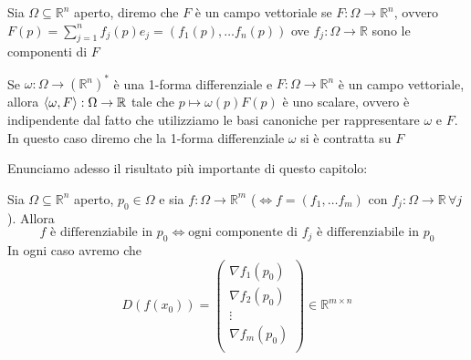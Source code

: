 \documentclass[openany, italian]{book}
\begin{document}
\begin{definition}
Sia $\Omega \subseteq \mathbb{R}^n$ aperto, diremo che $F$ è un campo vettoriale se $F: \Omega \to \mathbb{R}^n$, ovvero $F(p) = \sum\limits_{j=1}^n f_j(p)e_j = (f_1(p), \ldots f_n(p))$ ove $f_j: \Omega \to \mathbb{R}$ sono le componenti di $F$
\end{definition}
\begin{remark}
Se $\omega: \Omega \to (\mathbb{R}^n)^{*}$ è una 1-forma differenziale e $F: \Omega \to \mathbb{R}^n$ è un campo vettoriale, allora $\langle \omega, F \rangle: \Omega \to \mathbb{R}$ tale che $p \mapsto \omega(p)F(p)$ è uno scalare, ovvero è indipendente dal fatto che utilizziamo le basi canoniche per rappresentare $\omega$ e $F$. In questo caso diremo che la 1-forma differenziale $\omega$ si è contratta su $F$
\end{remark}
Enunciamo adesso il risultato più importante di questo capitolo:
\begin{theorem}
Sia $\Omega \subseteq \mathbb{R}^n$ aperto, $p_0 \in \Omega$ e sia $f: \Omega \to \mathbb{R}^m$ ($\iff f=(f_1, \ldots f_m)$ con $f_j: \Omega \to \mathbb{R} \, \forall j$). Allora 
$$
f \text{ è differenziabile in } p_0 \iff \text{ogni componente di } f_j \text{ è differenziabile in } p_0
$$
In ogni caso avremo che
$$
D(f(x_0)) = \begin{pmatrix}
\nabla{f_1(p_0)} \\
\nabla{f_2(p_0)} \\
\vdots \\
\nabla{f_m(p_0)} \\
\end{pmatrix} \in \mathbb{R}^{m \times n}
$$
\end{theorem}
\end{document}
